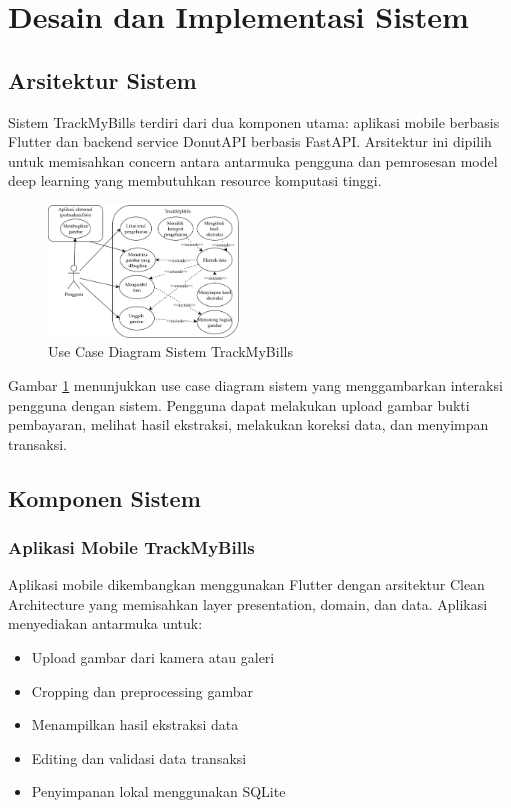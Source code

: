 \section{Desain dan Implementasi Sistem}

\subsection{Arsitektur Sistem}
Sistem TrackMyBills terdiri dari dua komponen utama: aplikasi mobile berbasis Flutter dan backend service DonutAPI berbasis FastAPI. Arsitektur ini dipilih untuk memisahkan concern antara antarmuka pengguna dan pemrosesan model deep learning yang membutuhkan resource komputasi tinggi.

\begin{figure}[htbp]
    \centerline{\includegraphics[width=0.45\textwidth]{images/use-case-diagram.png}}
    \caption{Use Case Diagram Sistem TrackMyBills}
    \label{fig:usecase}
\end{figure}

Gambar \ref{fig:usecase} menunjukkan use case diagram sistem yang menggambarkan interaksi pengguna dengan sistem. Pengguna dapat melakukan upload gambar bukti pembayaran, melihat hasil ekstraksi, melakukan koreksi data, dan menyimpan transaksi.

\subsection{Komponen Sistem}

\subsubsection{Aplikasi Mobile TrackMyBills}
Aplikasi mobile dikembangkan menggunakan Flutter dengan arsitektur Clean Architecture yang memisahkan layer presentation, domain, dan data. Aplikasi menyediakan antarmuka untuk:
\begin{itemize}
    \item Upload gambar dari kamera atau galeri
    \item Cropping dan preprocessing gambar
    \item Menampilkan hasil ekstraksi data
    \item Editing dan validasi data transaksi
    \item Penyimpanan lokal menggunakan SQLite
\end{itemize}

